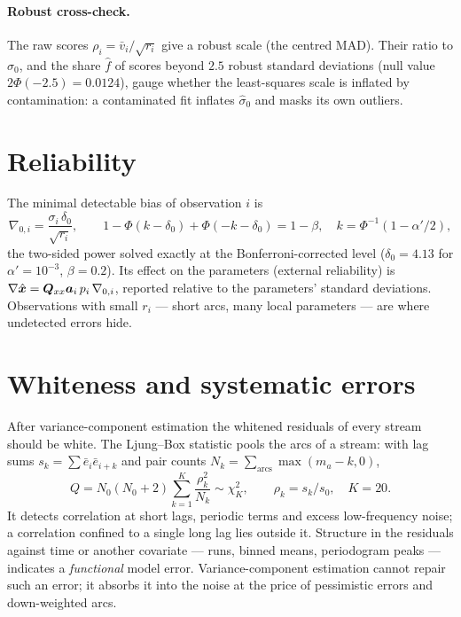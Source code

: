 \paragraph{Robust cross-check.} The raw scores $\rho_i=\bar v_i/\sqrt{r_i}$ give a robust scale
(the centred MAD). Their ratio to $\hat\sigma_0$, and the share $\hat f$ of scores beyond $2.5$
robust standard deviations (null value $2\Phi(-2.5)=0.0124$), gauge whether the least-squares scale
is inflated by contamination: a contaminated fit inflates $\hat\sigma_0$ and masks its own outliers.

\section{Reliability}\label{sec:reliability}

The minimal detectable bias of observation $i$ is
\begin{equation}
\nabla_{0,i}=\frac{\sigma_i\,\delta_0}{\sqrt{r_i}},\qquad
1-\Phi(k-\delta_0)+\Phi(-k-\delta_0)=1-\beta,\quad k=\Phi^{-1}(1-\alpha'/2),
\end{equation}
the two-sided power solved exactly at the Bonferroni-corrected level ($\delta_0=4.13$ for
$\alpha'=10^{-3}$, $\beta=0.2$). Its effect on the parameters (external reliability) is
$\nabla\hat{\bm{x}}=\bm{Q}_{xx}\bm{a}_i\,p_i\,\nabla_{0,i}$, reported relative to the parameters'
standard deviations. Observations with small $r_i$ --- short arcs, many local parameters --- are
where undetected errors hide.

\section{Whiteness and systematic errors}\label{sec:whiteness}

After variance-component estimation the whitened residuals of every stream should be white. The
Ljung--Box statistic pools the arcs of a stream: with lag sums $s_k=\sum\bar e_i\bar e_{i+k}$ and
pair counts $N_k=\sum_{\mathrm{arcs}}\max(m_a-k,0)$,
\begin{equation}
Q=N_0(N_0+2)\sum_{k=1}^{K}\frac{\rho_k^2}{N_k}\sim\chi^2_K,\qquad\rho_k=s_k/s_0,\quad K=20 .
\end{equation}
It detects correlation at short lags, periodic terms and excess low-frequency noise; a correlation
confined to a single long lag lies outside it. Structure in the residuals against time or another
covariate --- runs, binned means, periodogram peaks --- indicates a \emph{functional} model error.
Variance-component estimation cannot repair such an error; it absorbs it into the noise at the
price of pessimistic errors and down-weighted arcs.

